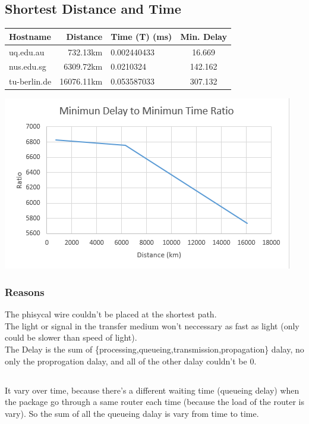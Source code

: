 \documentclass{article}
\begin{document}
\subsection{Shortest Distance and Time}


\begin{tabular}{|l|r|l|c|}
    \hline
    Hostname & Distance & Time (T) (ms) & Min. Delay\\
    \hline
    uq.edu.au   &   732.13km& 0.002440433&16.669\\
    nus.edu.sg  &  6309.72km& 0.0210324  &142.162\\
    tu-berlin.de& 16076.11km& 0.053587033&307.132\\
    \hline
\end{tabular}

\includegraphics[width=\textwidth]{ratio.png}

\subsubsection{Reasons}
The phisycal wire couldn't be placed at the shortest path. \\
The light or signal in the transfer medium won't neccessary as fast as light (only could be slower than speed of light).\\
The Delay is the sum of \{processing,queueing,transmission,propagation\} dalay, no only the proprogation dalay, and all of the other dalay couldn't be 0.

\subsection{}
It vary over time, because there's a different waiting time (queueing delay) when the package go through a same router each time (because the load of the router is vary). So the sum of all the queueing dalay is vary from time to time.
\end{document}
